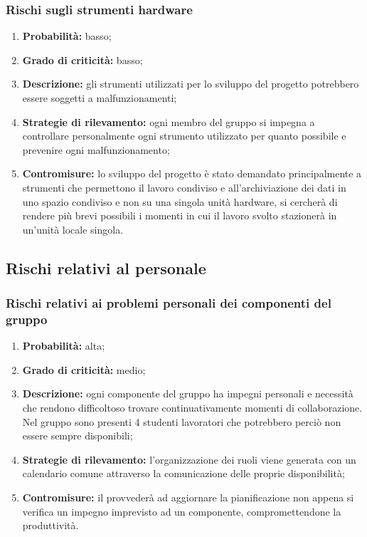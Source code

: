 \subsubsection{Rischi sugli strumenti hardware}
\begin{enumerate}
	\item \textbf{Probabilità:} basso;
	\item \textbf{Grado di criticità:} basso;
	\item \textbf{Descrizione:} gli strumenti utilizzati per lo sviluppo del progetto potrebbero essere soggetti a malfunzionamenti;
	\item \textbf{Strategie di rilevamento:} ogni membro del gruppo si impegna a controllare personalmente ogni strumento utilizzato per quanto possibile e prevenire ogni malfunzionamento;
	\item \textbf{Contromisure:} lo sviluppo del progetto è stato demandato principalmente a strumenti che permettono il lavoro condiviso e all’archiviazione dei dati in uno spazio condiviso e non su una singola unità hardware, si cercherà di rendere più brevi possibili i momenti in cui il lavoro svolto stazionerà in un’unità locale singola.
\end{enumerate}

\subsection{Rischi relativi al personale}
\subsubsection{Rischi relativi ai problemi personali dei componenti del gruppo}
\begin{enumerate}
	\item \textbf{Probabilità:} alta;
	\item \textbf{Grado di criticità:} medio;
	\item \textbf{Descrizione:} ogni componente del gruppo ha impegni personali e necessità che rendono difficoltoso trovare continuativamente momenti di collaborazione. Nel gruppo sono presenti 4 studenti lavoratori che potrebbero perciò non essere sempre disponibili;
	\item \textbf{Strategie di rilevamento:} l’organizzazione dei ruoli viene generata con un calendario comune attraverso la comunicazione delle proprie disponibilità;
	\item \textbf{Contromisure:} il \Responsabile{} provvederà ad aggiornare la pianificazione non appena si verifica un impegno imprevisto ad un componente, compromettendone la produttività.
\end{enumerate}

